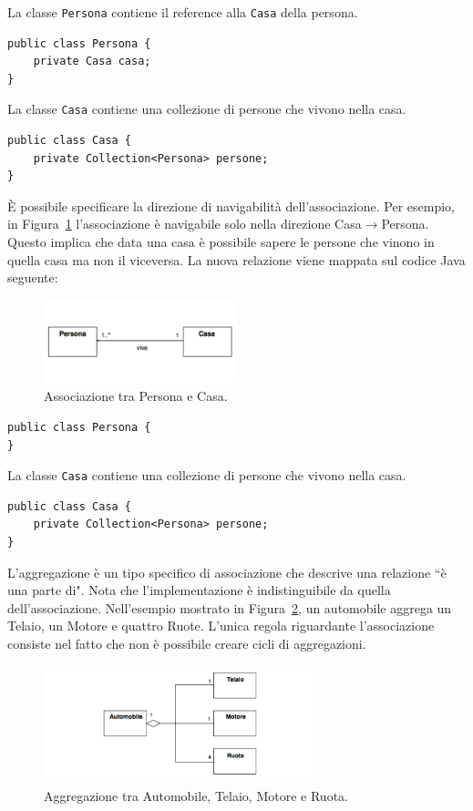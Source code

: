 \documentclass{article}
\begin{document}
La classe \texttt{Persona} contiene il reference alla \texttt{Casa} della persona.
\begin{lstlisting}
public class Persona {
    private Casa casa; 
}
\end{lstlisting}
La classe \texttt{Casa} contiene una collezione di persone che vivono nella casa.
\begin{lstlisting}
public class Casa {
    private Collection<Persona> persone; 
}
\end{lstlisting}
\`E possibile specificare la direzione di navigabilit\`a dell'associazione. 
Per esempio, in Figura~\ref{Fig:Associazione2} l'associazione \`e navigabile solo nella direzione Casa$\rightarrow$Persona. Questo implica che data una casa \`e possibile sapere le persone che vinono in quella casa ma non il viceversa. La nuova relazione viene mappata sul codice Java seguente:

\begin{figure}[h!]
  \centering
    \includegraphics[width=0.5\textwidth]{Img/Associazione2.pdf}
      \caption{Associazione tra Persona e Casa.}
      \label{Fig:Associazione2}
\end{figure}

\begin{lstlisting}
public class Persona {
}
\end{lstlisting}
La classe \texttt{Casa} contiene una collezione di persone che vivono nella casa.
\begin{lstlisting}
public class Casa {
    private Collection<Persona> persone; 
}
\end{lstlisting}

L'aggregazione \`e un tipo specifico di associazione che descrive una relazione ``\`e una parte di". Nota che l'implementazione \`e indistinguibile da quella dell'associazione. Nell'esempio mostrato in Figura~\ref{Fig:Aggregazione}, un automobile aggrega un Telaio, un Motore e quattro Ruote. L'unica regola riguardante l'associazione consiste nel fatto che non \`e possibile creare cicli di aggregazioni. 

\begin{figure}[h!]
  \centering
    \includegraphics[width=0.7\textwidth]{Img/Aggregazione.pdf}
      \caption{Aggregazione tra Automobile, Telaio, Motore e Ruota.}
      \label{Fig:Aggregazione}
\end{figure}
\end{document}
